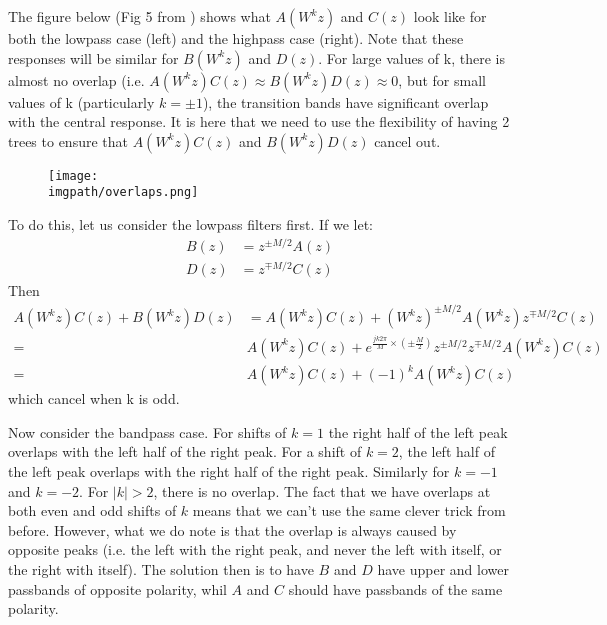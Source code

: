 The figure below (Fig 5 from \cite{kingsbury_complex_2001}) shows what $A(W^kz)$
and $C(z)$ look like for both the lowpass case (left) and the highpass case
(right). Note that these responses will be similar for $B(W^kz)$ and $D(z)$. For
large values of k, there is almost no overlap (i.e. 
$A(W^kz)C(z) \approx B(W^kz)D(z) \approx 0$, 
but for small values of k (particularly $k = \pm 1$),
the transition bands have significant overlap with the central response. It is
here that we need to use the flexibility of having 2 trees to ensure that
$A(W^kz)C(z)$ and $B(W^kz)D(z)$ cancel out.
\begin{figure}
  \centering
  \texttt{[image: \\imgpath/overlaps.png]}
\end{figure}
To do this, let us consider the lowpass filters first. If we let:
\begin{align}
  B(z) &= z^{\pm M/2}A(z) \\
  D(z) &= z^{\mp M/2}C(z)
\end{align}
Then
\begin{align}
  A(W^kz)C(z) + B(W^kz)D(z) &= A(W^kz)C(z) + (W^kz)^{\pm M/2}A(W^kz) z^{\mp M/2}C(z) \\
  =& A(W^kz)C(z) + e^{\frac{jk2\pi}{M} \times (\pm \frac{M}{2})} z^{\pm M/2} z^{\mp M/2} A(W^kz)C(z) \\
  =& A(W^kz)C(z) + (-1)^k A(W^kz)C(z)
\end{align}
which cancel when k is odd.

Now consider the bandpass case. For shifts of $k=1$ the right half of the left
peak overlaps with the left half of the right peak. For a shift of $k=2$, the
left half of the left peak overlaps with the right half of the right peak.
Similarly for $k=-1$ and $k=-2$. For $|k| > 2$, there is no overlap. The fact
that we have overlaps at both even and odd shifts of $k$ means that we can't use
the same clever trick from before. However, what we do note is that the overlap
is always caused by opposite peaks (i.e. the left with the right peak, and never
the left with itself, or the right with itself). The solution then is to have
$B$ and $D$ have upper and lower passbands of opposite polarity, whil $A$ and
$C$ should have passbands of the same polarity.


